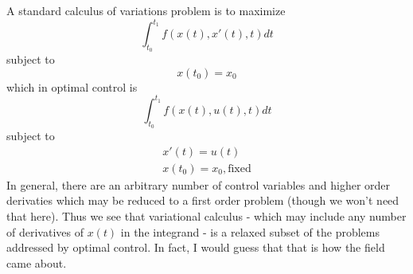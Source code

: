 \documentclass[11pt]{article}
\numberwithin{equation}{section}
\begin{document}
A standard calculus of variations problem is to maximize
\begin{equation}
\int_{t_0}^{t_1}f(x(t),x'(t),t)dt
\end{equation}
subject to
\begin{equation}
x(t_0) = x_0
\end{equation}
which in optimal control is 
\begin{equation}
\int_{t_0}^{t_1}f(x(t),u(t),t)dt
\end{equation}
subject to
\begin{align}
x'(t) = u(t) \\
x(t_0) = x_0, \text{fixed}
\end{align}
In general, there are an arbitrary number of control variables and higher order derivaties which may be reduced to a first order problem (though we won't need that here). Thus we see that variational calculus - which may include any number of derivatives of $x(t)$ in the integrand - is a relaxed subset of the problems addressed by optimal control. In fact, I would guess that that is how the field came about.
\end{document}

